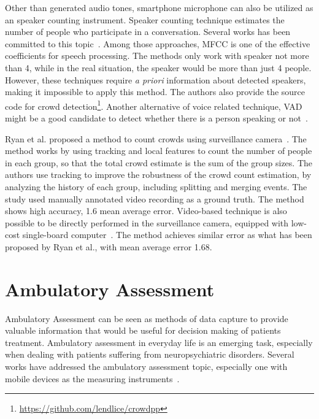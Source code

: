 	Other than generated audio tones, smartphone microphone can also be utilized as an speaker counting instrument. Speaker counting technique estimates the number of people who participate in a conversation. Several works has been committed to this topic~\cite{thesis067,thesis074,thesis071}. Among those approaches, \ac{MFCC} is one of the effective coefficients for speech processing. The methods only work with speaker not more than 4, while in the real situation, the speaker would be more than just 4 people. However, these techniques require \textit{a priori} information about detected speakers, making it impossible to apply this method. The authors also provide the source code for crowd detection\footnote{\url{https://github.com/lendlice/crowdpp}}. Another alternative of voice related technique, VAD might be a good candidate to detect whether there is a person speaking or not~\cite{thesis070}.
	
	Ryan et al. proposed a method to count crowds using surveillance camera~\cite{thesis034}. The method works by using tracking and local features to count the number of people in each group, so that the total crowd estimate is the sum of the group sizes. The authors use tracking to improve the robustness of the crowd count estimation, by analyzing the history of each group, including splitting and merging events. The study used manually annotated video recording as a ground truth. The method shows high accuracy, 1.6 mean average error. Video-based technique is also possible to be directly performed in the surveillance camera, equipped with low-cost single-board computer~\cite{thesis055}. The method achieves similar error as what has been proposed by Ryan et al., with mean average error 1.68.


	





\section{Ambulatory Assessment} %
\label{sec:ambulatory_assessment}
Ambulatory Assessment can be seen as methods of data capture to provide valuable information that would be useful for decision making of patients treatment. Ambulatory assessment in everyday life is an emerging task, especially when dealing with patients suffering from neuropsychiatric disorders. Several works have addressed the ambulatory assessment topic, especially one with mobile devices as the measuring instruments~\cite{thesis001,thesis031,thesis030,thesis015}.

